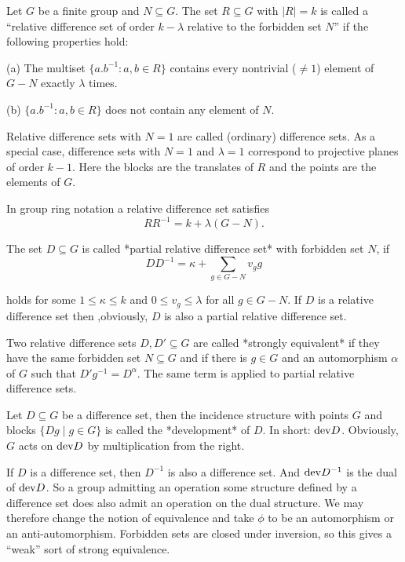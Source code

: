 Let $G$ be a finite group and $N\subseteq G$. The set $R\subseteq G$
with $|R|=k$ is called a ``relative difference set of order
$k-\lambda$ relative to the forbidden set $N$'' if the following
properties hold:

\beginlist%
\item{(a)} The multiset $\{ a.b^{-1}\colon a,b\in R\}$ contains every
  nontrivial ($\neq 1$) element of $G-N$ exactly $\lambda$ times.
\item{(b)} $\{ a.b^{-1}\colon a,b\in R\}$ does not contain any element
  of $N$.
\endlist

Relative difference sets with $N=1$ are called (ordinary) difference
sets. As a special case, difference sets with $N=1$ and $\lambda=1$
correspond to projective planes of order $k-1$.  Here the blocks are
the translates of $R$ and the points are the elements of $G$.

In group ring notation a relative difference set satisfies
$$
RR^{-1}=k+\lambda(G-N).
$$

The set $D\subseteq G$ is called *partial relative difference set*
with forbidden set $N$, if
$$
    DD^{-1}=\kappa+\sum_{g\in G-N}v_gg   
$$ 

holds for some $1\leq\kappa\leq k$ and $0\leq v_g \leq \lambda$ for
all $g\in G-N$.  If $D$ is a relative difference set then ,obviously,
$D$ is also a partial relative difference set.

Two relative difference sets $D,D'\subseteq G$ are called *strongly
equivalent* if they have the same forbidden set $N\subseteq G$ and if
there is $g\in G$ and an automorphism $\alpha$ of $G$ such that
$D'g^{-1}=D^\alpha$. The same term is applied to partial relative
difference sets.

Let $D\subseteq G$ be a difference set, then the incidence structure
with points $G$ and blocks $\{Dg\;|\;g\in G\}$ is called the
*development* of $D$. In short:  ${\rm dev} D$. Obviously, $G$ acts on
${\rm dev}D$ by multiplication from the right.

If $D$ is a difference set, then $D^{-1}$ is also a difference set.
And ${\rm dev} D^{-1}$ is the dual of ${\rm dev} D$. So a group
admitting an operation some structure defined by a difference set does
also admit an operation on the dual structure. We may therefore change
the notion of equivalence and take $\phi$ to be an automorphism or an
anti-automorphism. Forbidden sets are closed under inversion, so this
gives a ``weak'' sort of strong equivalence.



